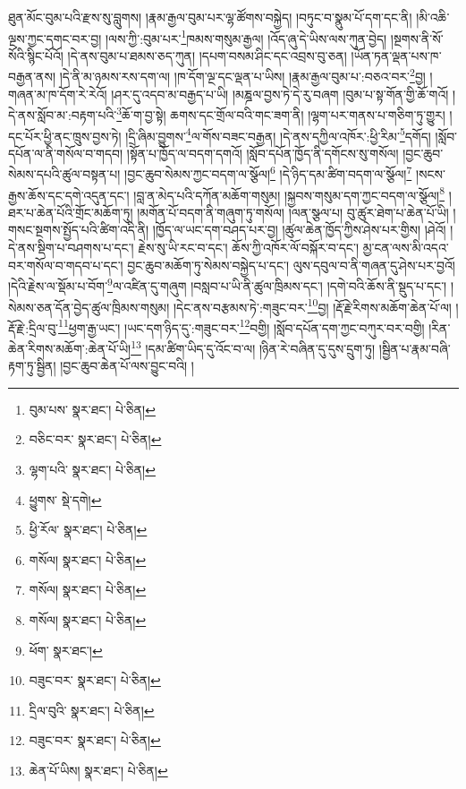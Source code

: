 ཐུན་མོང་བུམ་པའི་རྫས་སུ་བླུགས། །རྣམ་རྒྱལ་བུམ་པར་ལྷ་ཚོགས་བསྐྱེད། །བཏུང་བ་སྣུམ་པོ་དག་དང་ནི། །མི་འཆི་ལྔས་ཀྱང་དགང་བར་བྱ། །ལས་ཀྱི་:བུམ་པར་\footnote{བུམ་པས་  སྣར་ཐང་།  པེ་ཅིན། }ཁམས་གསུམ་རྒྱལ། །འོད་ཞུ་དེ་ཡིས་ལས་ཀུན་བྱེད། །སྔགས་ནི་སོ་སོའི་སྙིང་པོའོ། །དེ་ནས་བུམ་པ་ཐམས་ཅད་ཀུན། །དཔག་བསམ་ཤིང་དང་འབྲས་བུ་ཅན། །ཡོན་ཏན་ལྡན་པས་ཁ་བརྒྱན་ནས། །དེ་ནི་མ་ཉམས་རས་དག་ལ། །ཁ་དོག་ལྔ་དང་ལྡན་པ་ཡིས། །རྣམ་རྒྱལ་བུམ་པ་:བཅའ་བར་\footnote{བཅིང་བར་  སྣར་ཐང་།  པེ་ཅིན། }བྱ། །གཞན་མ་ཁ་དོག་རེ་རེའོ། །ཤར་དུ་འདབ་མ་བརྒྱད་པ་ཡི། །མཎྜལ་བྱས་ཏེ་དེ་རུ་བཞག །བུམ་པ་སྟ་གོན་གྱི་ཆོ་གའོ། །དེ་ནས་སློབ་མ་:བརྟག་པའི་\footnote{ལྷག་པའི་  སྣར་ཐང་།  པེ་ཅིན། }ཆོ་ག་བྱ་སྟེ། ཆགས་དང་གྲོལ་བའི་གང་ཟག་ནི། །ལྷག་པར་གནས་པ་གཅིག་ཏུ་གྱུར། །དང་པོར་ཕྱི་ནང་ཁྲུས་བྱས་ཏེ། །དྲི་ཞིམ་བྱུགས་\footnote{ཕྱུགས་  སྡེ་དགེ། }ལ་གོས་བཟང་བརྒྱན། །དེ་ནས་དཀྱིལ་འཁོར་:ཕྱི་རིམ་\footnote{ཕྱི་རོལ་  སྣར་ཐང་།  པེ་ཅིན། }དགོད། །སློབ་དཔོན་ལ་ནི་གསོལ་བ་གདབ། །སྟོན་པ་ཁྱོད་ལ་བདག་དགའོ། །སློབ་དཔོན་ཁྱོད་ནི་དགོངས་སུ་གསོལ། །བྱང་ཆུབ་སེམས་དཔའི་ཚུལ་བསྟན་པ། །བྱང་ཆུབ་སེམས་ཀྱང་བདག་ལ་སྩོལ།\footnote{གསོལ།  སྣར་ཐང་།  པེ་ཅིན། } །དེ་ཉིད་དམ་ཚིག་བདག་ལ་སྩོལ།\footnote{གསོལ།  སྣར་ཐང་།  པེ་ཅིན། } །སངས་རྒྱས་ཆོས་དང་དགེ་འདུན་དང་། །བླ་ན་མེད་པའི་དཀོན་མཆོག་གསུམ། །སྐྱབས་གསུམ་དག་ཀྱང་བདག་ལ་སྩོལ།\footnote{གསོལ།  སྣར་ཐང་།  པེ་ཅིན། } །ཐར་པ་ཆེན་པོའི་གྲོང་མཆོག་ཏུ། །མགོན་པོ་བདག་ནི་གཞུག་ཏུ་གསོལ། །ལན་སྩལ་པ། བུ་ཚུར་ཐེག་པ་ཆེན་པོ་ཡི། །གསང་སྔགས་སྤྱོད་པའི་ཚིག་འདི་ནི། །ཁྱོད་ལ་ཡང་དག་བཤད་པར་བྱ། །ཚུལ་ཆེན་ཁྱོད་ཀྱིས་ཤེས་པར་གྱིས། །ཤེའོ། །དེ་ནས་སྡིག་པ་བཤགས་པ་དང་། རྗེས་སུ་ཡི་རང་བ་དང་། ཆོས་ཀྱི་འཁོར་ལོ་བསྐོར་བ་དང་། མྱ་ངན་ལས་མི་འདའ་བར་གསོལ་བ་གདབ་པ་དང་། བྱང་ཆུབ་མཆོག་ཏུ་སེམས་བསྐྱེད་པ་དང་། ལུས་དབུལ་བ་ནི་གཞན་དུ་ཤེས་པར་བྱའོ། །དེའི་རྗེས་ལ་སྡོམ་པ་བོག་\footnote{ཕོག་  སྣར་ཐང་། }ལ་འཛིན་དུ་གཞུག །བསླབ་པ་ཡི་ནི་ཚུལ་ཁྲིམས་དང་། །དགེ་བའི་ཆོས་ནི་སྡུད་པ་དང་། །སེམས་ཅན་དོན་བྱེད་ཚུལ་ཁྲིམས་གསུམ། །དེང་ནས་བརྩམས་ཏེ་:གཟུང་བར་\footnote{བཟུང་བར་  སྣར་ཐང་།  པེ་ཅིན། }བྱ། །རྡོ་རྗེ་རིགས་མཆོག་ཆེན་པོ་ལ། །རྡོ་རྗེ་:དྲིལ་བུ་\footnote{དྲིལ་བུའི་  སྣར་ཐང་།  པེ་ཅིན། }ཕྱག་རྒྱ་ཡང་། །ཡང་དག་ཉིད་དུ་:གཟུང་བར་\footnote{བཟུང་བར་  སྣར་ཐང་།  པེ་ཅིན། }བགྱི། །སློབ་དཔོན་དག་ཀྱང་བཀུར་བར་བགྱི། །རིན་ཆེན་རིགས་མཆོག་:ཆེན་པོ་ཡི།\footnote{ཆེན་པོ་ཡིས།  སྣར་ཐང་།  པེ་ཅིན། } །དམ་ཚིག་ཡིད་དུ་འོང་བ་ལ། །ཉིན་རེ་བཞིན་དུ་དུས་དྲུག་ཏུ། །སྦྱིན་པ་རྣམ་བཞི་རྟག་ཏུ་སྦྱིན། །བྱང་ཆུབ་ཆེན་པོ་ལས་བྱུང་བའི། །
